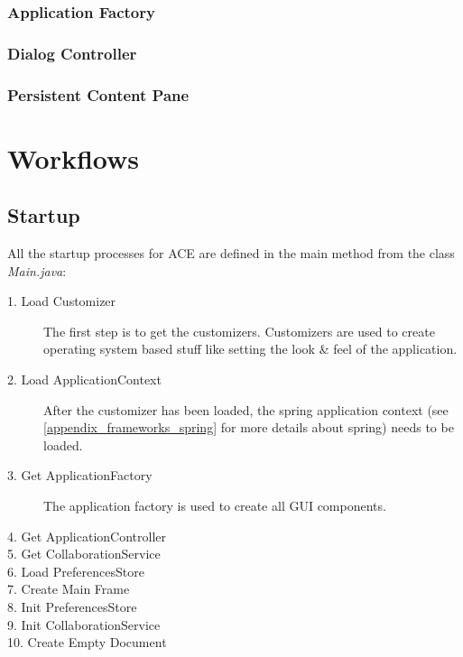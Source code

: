 \subsubsection{Application Factory}
\label{applicationlayer_applicationfactory}
\subsubsection{Dialog Controller}
\subsubsection{Persistent Content Pane}



\newpage
\section{Workflows}

\subsection{Startup}
All the startup processes for ACE are defined in the main method from the class \textit{Main.java}:
\begin{description}
\item[1. Load Customizer ] The first step is to get the customizers. Customizers are used to create operating system based stuff like setting the look \& feel of the application.
\item[2. Load ApplicationContext ] After the customizer has been loaded, the spring application context (see \ref{appendix_frameworks_spring} for more details about spring) needs to be loaded.
\item[3. Get ApplicationFactory ] The application factory is used to create all GUI components.
\item[4. Get ApplicationController ]  
\item[5. Get CollaborationService ] 
\item[6. Load PreferencesStore ]
\item[7. Create Main Frame ]
\item[8. Init PreferencesStore ]
\item[9. Init CollaborationService ]
\item[10. Create Empty Document ]
\end{description}

